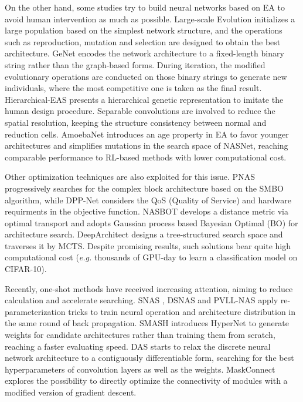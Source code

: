 \documentclass[journal]{IEEEtran}
\begin{document}
On the other hand, some studies try to build neural networks based on EA to avoid human intervention as much as possible. Large-scale Evolution \cite{DBLP:conf/icml/RealMSSSTLK17} initializes a large population based on the simplest network structure, and the operations such as reproduction, mutation and selection are designed to obtain the best architecture. GeNet \cite{DBLP:conf/iccv/XieY17} encodes the network architecture to a fixed-length binary string rather than the graph-based forms. During iteration, the modified evolutionary operations are conducted on those binary strings to generate new individuals, where the most competitive one is taken as the final result. Hierarchical-EAS \cite{DBLP:conf/iclr/LiuSVFK18} presents a hierarchical genetic representation to imitate the human design procedure. Separable convolutions are involved to reduce the spatial resolution, keeping the structure consistency between normal and reduction cells. AmoebaNet \cite{DBLP:conf/aaai/RealAHL19} introduces an age property in EA to favor younger architectures and simplifies mutations in the search space of NASNet, reaching comparable performance to RL-based methods with lower computational cost.


Other optimization techniques are also exploited for this issue. PNAS \cite{DBLP:conf/eccv/LiuZNSHLFYHM18} progressively searches for the complex block architecture based on the SMBO algorithm, while DPP-Net \cite{DBLP:conf/eccv/DongCJWS18} considers the QoS (Quality of Service) and hardware requirments in the objective function. NASBOT \cite{DBLP:conf/nips/KandasamyNSPX18} develops a distance metric via optimal transport and adopts Gaussian process based Bayesian Optimal (BO) for architecture search. DeepArchitect \cite{DBLP:journals/corr/NegrinhoG17} designs a tree-structured search space and traverses it by MCTS. Despite promising results, such solutions bear quite high computational cost (\emph{e.g.} thousands of GPU-day to learn a classification model on CIFAR-10). 

Recently, one-shot methods have received increasing attention, aiming to reduce calculation and accelerate searching. SNAS \cite{DBLP:conf/iclr/XieZLL19}, DSNAS \cite{DBLP:conf/cvpr/HuXZLSLL20} and PVLL-NAS \cite{DBLP:conf/icml/LiDWX20} apply re-parameterization tricks to train neural operation and architecture distribution in the same round of back propagation. SMASH \cite{DBLP:conf/iclr/BrockLRW18} introduces HyperNet \cite{DBLP:conf/iclr/HaDL17} to generate weights for candidate architectures rather than training them from scratch, reaching a faster evaluating speed. DAS \cite{DBLP:conf/iclr/ShinPS18} starts to relax the discrete neural network architecture to a contiguously differentiable form, searching for the best hyperparameters of convolution layers as well as the weights. MaskConnect \cite{DBLP:conf/eccv/AhmedT18} explores the possibility to directly optimize the connectivity of modules with a modified version of gradient descent.
\end{document}
